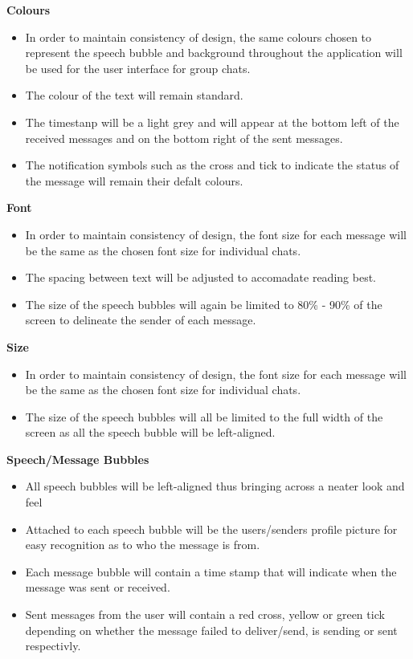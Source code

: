 \documentclass[11pt]{article}
\begin{document}
\textbf{Colours}\\
\begin{itemize}
\item	In order to maintain consistency of design, the same colours chosen to represent the speech bubble and background throughout the application will be used for the user interface for group chats.
\item	The colour of the text will remain standard.
\item The timestanp will be a light grey and will appear at the bottom left of the received  messages and on the bottom right of the sent messages.
\item The notification symbols such as the cross and tick to indicate the status of the message will remain their defalt colours.\\
\end{itemize}

\textbf{Font}\\
\begin{itemize}
\item	In order to maintain consistency of design, the font size for each message will be the same as the chosen font size for individual chats.
\item The spacing between text will be adjusted to accomadate reading best.
\item	The size of the speech bubbles will again be limited to 80\% - 90\% of the screen to delineate the sender of each message. \\
\end{itemize}

\textbf{Size}\\
\begin{itemize}
\item	In order to maintain consistency of design, the font size for each message will be the same as the chosen font size for individual chats.
\item	The size of the speech bubbles will all be limited to the full width of the screen as all the speech bubble will be left-aligned.\\
\end{itemize}

\textbf{Speech/Message Bubbles}\\
\begin{itemize}
\item	All speech bubbles will be left-aligned thus bringing across a neater look and feel
\item	Attached to each speech bubble will be the users/senders profile picture for easy recognition as to who the message is from.
\item Each message bubble will contain a time stamp that will indicate when the message was sent or received.
\item Sent messages from the user will contain a red cross, yellow or green tick depending on whether the message failed to deliver/send, is sending or sent respectivly.\\
\end{itemize}
\end{document}
